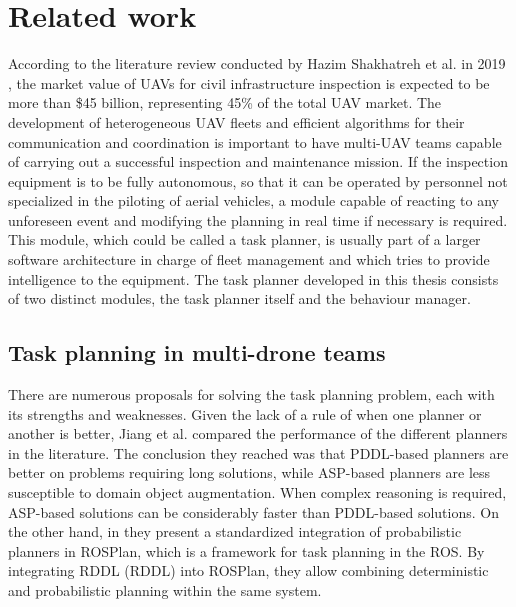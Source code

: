 \section{Related work}
\label{sec:RelatedWork}
According to the literature review conducted by Hazim Shakhatreh et al. in 2019 \cite{CivilAplications}, the market value of \glspl{UAV} for civil infrastructure inspection is expected to be more than \$45 billion, representing 45\% of the total \gls{UAV} market. The development of heterogeneous \gls{UAV} fleets and efficient algorithms for their communication and coordination is important to have multi-\gls{UAV} teams capable of carrying out a successful inspection and maintenance mission. If the inspection equipment is to be fully autonomous, so that it can be operated by personnel not specialized in the piloting of aerial vehicles, a module capable of reacting to any unforeseen event and modifying the planning in real time if necessary is required. This module, which could be called a task planner, is usually part of a larger software architecture in charge of fleet management and which tries to provide intelligence to the equipment. The task planner developed in this thesis consists of two distinct modules, the task planner itself and the behaviour manager.

\subsection{Task planning in multi-drone teams}
\label{subsec:TaskPlanning}
There are numerous proposals for solving the task planning problem, each with its strengths and weaknesses. Given the lack of a rule of when one planner or another is better, Jiang et al. \cite{jiang2019task} compared the performance of the different planners in the literature. The conclusion they reached was that \gls{PDDL}-based planners are better on problems requiring long solutions, while \gls{ASP}-based planners are less susceptible to domain object augmentation. When complex reasoning is required, \gls{ASP}-based solutions can be considerably faster than \gls{PDDL}-based solutions. On the other hand, in \cite{canal2019probabilistic} they present a standardized integration of probabilistic planners in ROSPlan, which is a framework for task planning in the \gls{ROS}. By integrating \acrshort{RDDL} (\acrlong{RDDL}) into ROSPlan, they allow combining deterministic and probabilistic planning within the same system.

